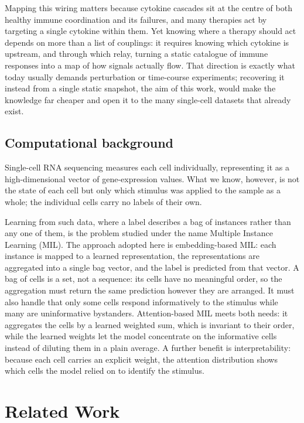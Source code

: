 \documentclass[11pt,a4paper]{article}
\begin{document}
Mapping this wiring matters because cytokine cascades sit at the centre of both healthy immune coordination and its failures, and many therapies act by targeting a single cytokine within them. Yet knowing where a therapy should act depends on more than a list of couplings: it requires knowing which cytokine is upstream, and through which relay, turning a static catalogue of immune responses into a map of how signals actually flow. That direction is exactly what today usually demands perturbation or time-course experiments; recovering it instead from a single static snapshot, the aim of this work, would make the knowledge far cheaper and open it to the many single-cell datasets that already exist.

\subsection{Computational background}
\label{sec:comp-background}
Single-cell RNA sequencing measures each cell individually, representing it as a high-dimensional vector of gene-expression values.
What we know, however, is not the state of each cell but only which stimulus was applied to the sample as a whole; the individual cells carry no labels of their own.

Learning from such data, where a label describes a bag of instances rather than any one of them, is the problem studied under the name Multiple Instance Learning (MIL).
The approach adopted here is embedding-based MIL: each instance is mapped to a learned representation, the representations are aggregated into a single bag vector, and the label is predicted from that vector.
A bag of cells is a set, not a sequence: its cells have no meaningful order, so the aggregation must return the same prediction however they are arranged. It must also handle that only some cells respond informatively to the stimulus while many are uninformative bystanders. Attention-based MIL meets both needs: it aggregates the cells by a learned weighted sum, which is invariant to their order, while the learned weights let the model concentrate on the informative cells instead of diluting them in a plain average. A further benefit is interpretability: because each cell carries an explicit weight, the attention distribution shows which cells the model relied on to identify the stimulus.

\section{Related Work}
\label{sec:related-work}
\end{document}
